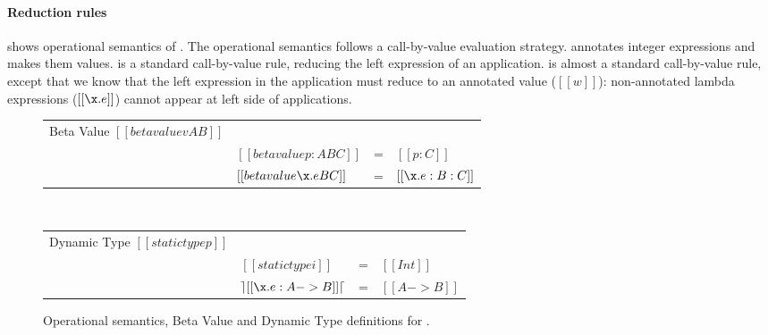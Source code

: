\paragraph{Reduction rules}
 shows operational semantics of \cal.
The operational semantics follows a call-by-value evaluation strategy.
 annotates integer expressions and makes them
values.  is a standard call-by-value rule, reducing
the left expression of an application.
 is almost a standard call-by-value rule, except
that we know that the left expression in the application must reduce
to an annotated value ($[[w]]$): non-annotated lambda expressions
($[[\x.e]]$) cannot appear at left side of applications.

\begin{figure}[t]
  \begin{small}
    \centering
  \end{small}
  \bigskip
  \begin{center}
  {\renewcommand{\arraystretch}{1.2}
    \begin{tabular}{|llcl|}
      \hline
      Beta Value $[[betavalue v A B]]$ &  & & \\
     & $[[betavalue p:A B C]]$ & = & $[[p:C]]$ \\
     & $[[betavalue \x.e B C]]$ & = & $[[\x.e:B:C]]$ \\
      \hline
    \end{tabular} } \\
  \bigskip
  {\renewcommand{\arraystretch}{1.2}
    \begin{tabular}{|llcl|}
      \hline
      Dynamic Type $[[statictype p]]$ &  & & \\
     & $[[statictype i]]$ & = & $[[Int]]$ \\
     & $\rceil [[\x.e: A -> B]] \lceil$ & = & $[[A -> B]]$ \\
      \hline
    \end{tabular} }
    \end{center}
  \caption{Operational semantics, Beta Value and Dynamic Type definitions for \cal.}
  \label{fig:union:os}
\end{figure}

